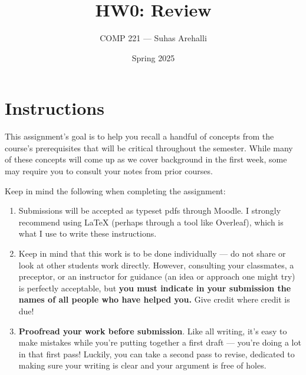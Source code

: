 \documentclass{exam}
\title{HW0: Review}
\author{COMP 221 --- Suhas Arehalli}
\date{Spring 2025}
\begin{document}
\maketitle

\section*{Instructions}
This assignment's goal is to help you recall a handful of concepts from the course's prerequisites that will be critical throughout the semester. While many of these concepts will come up as we cover background in the first week, some may require you to consult your notes from prior courses. 

Keep in mind the following when completing the assignment:
\begin{enumerate}
    \item Submissions will be accepted as typeset pdfs through Moodle. I strongly recommend using LaTeX (perhaps through a tool like Overleaf), which is what I use to write these instructions.
    \item Keep in mind that this work is to be done individually --- do not share or look at other students work directly. However, consulting your classmates, a preceptor, or an instructor for guidance (an idea or approach one might try) is perfectly acceptable, but \textbf{you must indicate in your submission the names of all people who have helped you.} Give credit where credit is due!
    \item \textbf{Proofread your work before submission}. Like all writing, it's easy to make mistakes while you're putting together a first draft --- you're doing a lot in that first pass! Luckily, you can take a second pass to revise, dedicated to making sure your writing is clear and your argument is free of holes. 
\end{enumerate}
\end{document}
